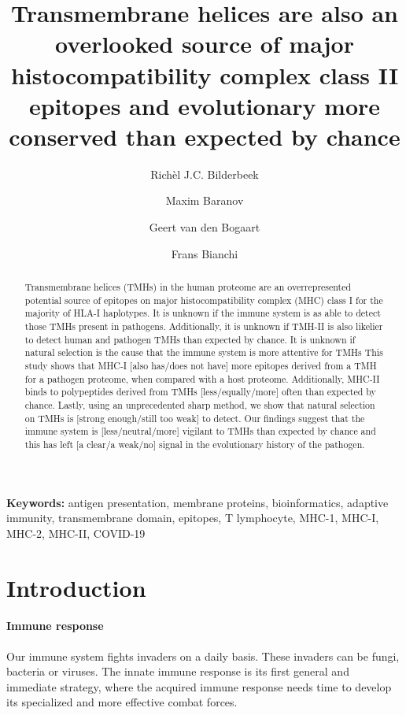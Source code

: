 \documentclass{article}
\title{
  Transmembrane helices are also 
  an overlooked source of major histocompatibility complex class II epitopes
  and evolutionary more conserved than expected by chance
}
\author[1]{Richèl J.C. Bilderbeek}
\author[1]{Maxim Baranov}
\author[1]{Geert van den Bogaart}
\author[1]{Frans Bianchi}
\affil[1]{GBB, University of 
Groningen, Groningen, The Netherlands}
\begin{document}
\maketitle

\begin{abstract}

Transmembrane helices (TMHs) in the human proteome
are an overrepresented potential source of epitopes on major 
histocompatibility complex (MHC) class I for the majority of HLA-I haplotypes. 
It is unknown if the immune system is as able to detect those 
TMHs present in pathogens.
Additionally, it is unknown if TMH-II is also likelier to detect
human and pathogen TMHs than expected by chance.
It is unknown if natural selection is the cause that 
the immune system is more attentive for TMHs
This study shows that MHC-I [also has/does not have] more
epitopes derived from a TMH for a pathogen proteome, when compared with
a host proteome.
Additionally, MHC-II binds to polypeptides derived from TMHs 
[less/equally/more] often than expected by chance.
Lastly, using an unprecedented sharp method, 
we show that natural selection on TMHs is [strong enough/still too weak]
to detect.
Our findings suggest that the immune system is [less/neutral/more]
vigilant to TMHs than expected by chance and this has 
left [a clear/a weak/no]
signal in the evolutionary history of the pathogen.

\end{abstract}

{\bf Keywords:} antigen presentation, membrane proteins, bioinformatics, 
adaptive immunity, transmembrane domain, epitopes, T lymphocyte, 
MHC-1, MHC-I, MHC-2, MHC-II, COVID-19

\section{Introduction}

\paragraph{Immune response}

Our immune system fights invaders on a daily basis.
These invaders can be fungi, bacteria or viruses.
The innate immune response is its first general 
and immediate strategy, where the acquired immune response
needs time to develop its specialized and more effective
combat forces.
\end{document}
